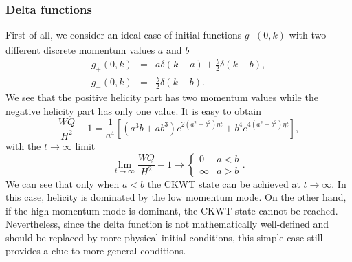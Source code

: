 \documentclass[english,aps,superscriptaddress,preprint]{revtex4-1}
\begin{document}
\subsubsection{Delta functions}

First of all, we consider an ideal case of initial functions $g_{\pm}\left(0,k\right)$
with two different discrete momentum values $a$ and $b$ 
\begin{eqnarray}
g_{+}(0,k) & = & a\delta(k-a)+\frac{b}{2}\delta(k-b),\nonumber \\
g_{-}(0,k) & = & \frac{b}{2}\delta(k-b).
\end{eqnarray}
We see that the positive helicity part has two momentum values while
the negative helicity part has only one value. It is easy to obtain
\begin{equation}
\frac{WQ}{H^{2}}-1=\frac{1}{a^{4}}\left[\left(a^{3}b+ab^{3}\right)e^{2\left(a^{2}-b^{2}\right)\eta t}+b^{4}e^{4\left(a^{2}-b^{2}\right)\eta t}\right],
\end{equation}
with the $t\rightarrow\infty$ limit 
\begin{equation}
\lim_{t\rightarrow\infty}\frac{WQ}{H^{2}}-1\rightarrow\begin{cases}
0 & a<b\\
\infty & a>b
\end{cases}.
\end{equation}
We can see that only when $a<b$ the CKWT state can be achieved at
$t\rightarrow\infty$. In this case, helicity is dominated by the
low momentum mode. On the other hand, if the high momentum mode is
dominant, the CKWT state cannot be reached. Nevertheless, since the
delta function is not mathematically well-defined and should be replaced
by more physical initial conditions, this simple case still provides
a clue to more general conditions.

\begin{comment}
The derivation
\begin{eqnarray*}
\frac{WQ}{H^{2}}-1 & = & \frac{1}{k_{1}^{2}}\left(2e^{2(k_{1}^{2}-k_{2}^{2})t}+1\right)\left(k_{1}^{2}+2e^{2(k_{1}^{2}-k_{2}^{2})t}k_{2}^{2}\right)-1\\
 & = & \frac{1}{k_{1}^{2}}\left[2(k_{1}^{2}+k_{2}^{2})e^{2(k_{1}^{2}-k_{2}^{2})t}+4k_{2}^{2}e^{4(k_{1}^{2}-k_{2}^{2})t}+k_{1}^{2}\right]-1\\
 & = & \frac{2}{k_{1}^{2}}\left[2k_{2}^{2}e^{4(k_{1}^{2}-k_{2}^{2})t}+(k_{1}^{2}+k_{2}^{2})e^{2(k_{1}^{2}-k_{2}^{2})t}\right]
\end{eqnarray*}
\end{comment}
\end{document}
